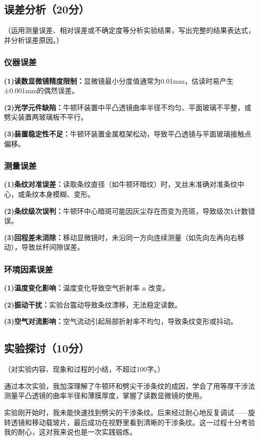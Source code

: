 \documentclass[]{../template/Report}%
\begin{document}
\begin{fullreportonly}
\subsection{误差分析（20分）}
（运用测量误差、相对误差或不确定度等分析实验结果，写出完整的结果表达式，并分析误差原因。）
\subsubsection{仪器误差}
\textbf{(1)读数显微镜精度限制：}显微镜最小分度值通常为0.01mm，估读时易产生±0.001mm的偶然误差。
\par
\textbf{(2)光学元件缺陷：}牛顿环装置中平凸透镜曲率半径不均匀、平面玻璃不平整，或劈尖装置两玻璃板不平行。
\par
\textbf{(3)装置稳定性不足：}牛顿环装置金属框架松动，导致平凸透镜与平面玻璃接触点偏移。

\subsubsection{测量误差}
\textbf{(1)条纹对准误差：}读取条纹直径（如牛顿环暗纹）时，叉丝未准确对准条纹中心，或条纹本身模糊、变形。
\par
\textbf{(2)条纹级次误判：}牛顿环中心暗斑可能因灰尘存在而变为亮斑，导致级次k计数错误。
\par
\textbf{(3)回程差未消除：}移动显微镜时，未沿同一方向连续测量（如先向左再向右移动），导致丝杆间隙误差。

\subsubsection{环境因素误差}
\textbf{(1)温度变化影响：}温度变化导致空气折射率 n 改变。
\par
\textbf{(2)振动干扰：}实验台震动导致条纹漂移，无法稳定读数。
\par
\textbf{(3)空气对流影响：}空气流动引起局部折射率不均匀，导致条纹变形或抖动。


\subsection{实验探讨（10分）}
（对实验内容、现象和过程的小结，不超过100字。）
\par
通过本次实验，我加深理解了牛顿环和劈尖干涉条纹的成因，学会了用等厚干涉法测量平凸透镜的曲率半径和薄膜厚度，掌握了读数显微镜的使用。
\par
实验刚开始时，我未能快速找到劈尖的干涉条纹。后来经过耐心地反复调试——旋转透镜和移动载玻片，最后成功在视野里看到清晰的干涉条纹。这一过程十分考验我的耐心，这对我来说也是一次实践锻炼。


\end{fullreportonly}
\end{document}
